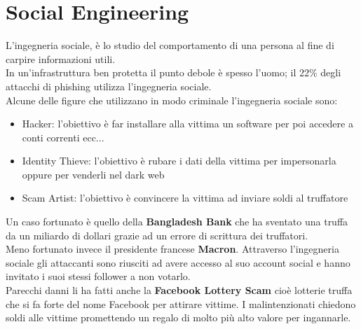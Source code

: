 \section{Social Engineering}
\label{sec:socialengineering}
L'ingegneria sociale, è lo studio del comportamento di una persona al fine di carpire informazioni utili.\\
In un'infrastruttura ben protetta il punto debole è spesso l'uomo; il 22\% degli attacchi di phishing utilizza l'ingegneria sociale.\\
Alcune delle figure che utilizzano in modo criminale l'ingegneria sociale sono:
\begin{itemize}
    \item Hacker: l'obiettivo è far installare alla vittima un software per poi accedere a conti correnti ecc...
    \item Identity Thieve: l'obiettivo è rubare i dati della vittima per impersonarla oppure per venderli nel dark web
    \item Scam Artist: l'obiettivo è convincere la vittima ad inviare soldi al truffatore
\end{itemize}
Un caso fortunato è quello della \textbf{Bangladesh Bank} che ha sventato una truffa da un miliardo di dollari grazie ad un errore di scrittura dei truffatori.\\
Meno fortunato invece il presidente francese \textbf{Macron}.
Attraverso l'ingegneria sociale gli attaccanti sono riusciti ad avere accesso al suo account social e hanno invitato i suoi stessi follower a non votarlo.\\
Parecchi danni li ha fatti anche la \textbf{Facebook Lottery Scam} cioè lotterie truffa che si fa forte del nome Facebook per attirare vittime.
I malintenzionati chiedono soldi alle vittime promettendo un regalo di molto più alto valore per ingannarle.

